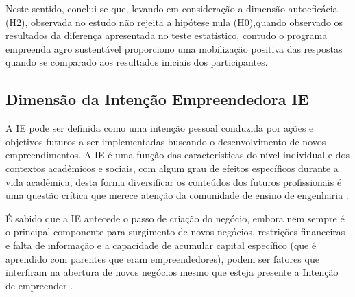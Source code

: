 Neste sentido, conclui-se que, levando em consideração a dimensão autoeficácia (H2), observada no estudo não rejeita a hipótese nula (H0),quando observado os resultados da diferença apresentada no teste estatístico, contudo o programa empreenda agro sustentável proporciono uma mobilização positiva das respostas quando se comparado aos resultados iniciais dos participantes.



\subsection{Dimensão da Intenção Empreendedora IE}

A IE pode ser definida como uma intenção pessoal conduzida por ações e objetivos futuros a ser implementadas buscando o desenvolvimento de novos empreendimentos. A IE é uma função das características do nível individual e dos contextos acadêmicos e sociais, com algum grau de efeitos específicos durante a vida acadêmica, desta forma diversificar os conteúdos dos futuros profissionais é uma questão crítica que merece atenção da comunidade de ensino de engenharia \cite{gilmartin_entrepreneurial_2019}.

É sabido que a IE antecede o passo de criação do negócio, embora nem sempre é o principal componente para surgimento de novos negócios, restrições financeiras e falta de informação e a capacidade de acumular capital específico (que é aprendido com parentes que eram empreendedores), podem ser fatores que interfiram na abertura de novos negócios mesmo que esteja presente a Intenção de empreender \cite{auguste_what_2016}.


